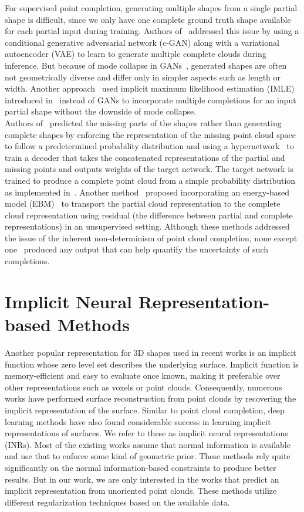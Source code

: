 For supervised point completion, generating multiple shapes from a single partial shape is difficult, since we only have one complete ground truth shape available for each partial input during training. Authors of~\cite{CGAN} addressed this issue by using a conditional generative adversarial network (c-GAN) along with a variational autoencoder (VAE) to learn to generate multiple complete clouds during inference. But because of mode collapse in GANs~\cite{ModeCollapseGAN}, generated shapes are often not geometrically diverse and differ only in simpler aspects such as length or width. Another approach~\cite{PCCIMLE} used implicit maximum likelihood estimation (IMLE) introduced in~\cite{IMLE} instead of GANs to incorporate multiple completions for an input partial shape without the downside of mode collapse. 
\\
Authors of~\cite{HyperPocket} predicted the missing parts of the shapes rather than generating complete shapes by enforcing the representation of the missing point cloud space to follow a predetermined probability distribution and using a hypernetwork~\cite{Hypernet} to train a decoder that takes the concatenated representations of the partial and missing points and outputs weights of the target network. The target network is trained to produce a complete point cloud from a simple probability distribution as implemented in~\cite{PCHypernet}. Another method~\cite{EBResLT} proposed incorporating an energy-based model (EBM)~\cite{EBM} to transport the partial cloud representation to the complete cloud representation using residual (the difference between partial and complete representations) in an unsupervised setting. Although these methods addressed the issue of the inherent non-determinism of point cloud completion, none except one~\cite{EBResLT} produced any output that can help quantify the uncertainty of such completions.


\section{Implicit Neural Representation-based Methods}\label{INR-old}
Another popular representation for 3D shapes used in recent works is an implicit function whose zero level set describes the underlying surface. Implicit function is memory-efficient and easy to evaluate once known, making it preferable over other representations such as voxels or point clouds. Consequently, numerous works have performed surface reconstruction from point clouds by recovering the implicit representation of the surface. Similar to point cloud completion, deep learning methods have also found considerable success in learning implicit representations of surfaces. We refer to these as implicit neural representations (INRs). Most of the existing works assume that normal information is available and use that to enforce some kind of geometric prior. These methods rely quite significantly on the normal information-based constraints to produce better results. But in our work, we are only interested in the works that predict an implicit representation from unoriented point clouds. These methods utilize different regularization techniques based on the available data. 
\newline

